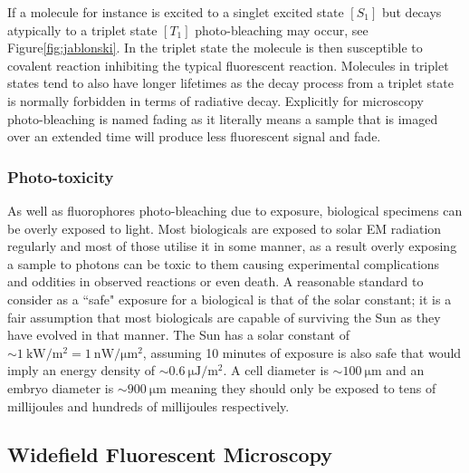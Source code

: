 If a molecule for instance is excited to a singlet excited state \([S_1]\) but decays atypically to a triplet state \([T_1]\) photo-bleaching may occur, see Figure\ref{fig:jablonski}.
In the triplet state the molecule is then susceptible to covalent reaction inhibiting the typical fluorescent reaction.
 Molecules in triplet states tend to also have longer lifetimes as the decay process from a triplet state is normally forbidden in terms of radiative decay.
Explicitly for microscopy photo-bleaching is named fading as it literally means a sample that is imaged over an extended time will produce less fluorescent signal and fade.

\subsubsection{Photo-toxicity}

As well as fluorophores photo-bleaching due to exposure, biological specimens can be overly exposed to light.
Most biologicals are exposed to solar EM radiation regularly and most of those utilise it in some manner, as a result overly exposing a sample to photons can be toxic to them causing experimental complications and oddities in observed reactions or even death.
A reasonable standard to consider as a ``safe" exposure for a biological is that of the solar constant; it is a fair assumption that most biologicals are capable of surviving the Sun as they have evolved in that manner.
The Sun has a solar constant of \(\sim\SI{1}{\kilo\watt\per\meter\squared}= \SI{1}{\nano\watt\per\micro\meter\squared}\), assuming \SI{10}{} minutes of exposure is also safe that would imply an energy density of  \(\sim \SI{0.6}{\micro\joule\per\meter\squared}\).
A cell diameter is \(\sim\SI{100}{\micro\meter}\) and an embryo diameter is \(\sim \SI{900}{\micro\meter}\) meaning they should only be exposed to tens of millijoules and hundreds of millijoules respectively\cite{Stelzer2015}.

\subsection{Widefield Fluorescent  Microscopy}

